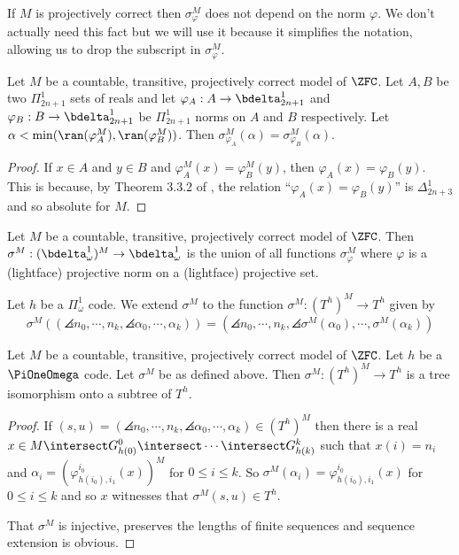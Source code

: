 \documentclass[oneside,12pt]{amsart}
\begin{document}
If $M$ is projectively correct then $\sigma^M_{\varphi}$ does not depend on the norm $\varphi$.
We don't actually need this fact but we will use it because it simplifies the
notation, allowing us to drop the subscript in $\sigma^M_{\varphi}$.

\begin{lemma}
Let $M$ be a countable, transitive, projectively correct model of $\ZFC$.
Let $A,B$ be two $\Pi^1_{2n+1}$ sets of reals and let $\varphi_A:A\to\bdelta^1_{2n+1}$
and $\varphi_B:B\to\bdelta^1_{2n+1}$ be $\Pi^1_{2n+1}$ norms on $A$ and $B$ respectively.
Let $\alpha < \min(\ran(\varphi^M_A),\ran(\varphi^M_B))$. Then
$\sigma^M_{\varphi_A}(\alpha) = \sigma^M_{\varphi_B}(\alpha)$.
\end{lemma}
\begin{proof}
If $x\in A$ and $y\in B$ and $\varphi^M_A(x) = \varphi^M_B(y)$, then
$\varphi_A(x)=\varphi_B(y)$. This is because,
by Theorem 3.3.2 of \cite{HarringtonKechris}, the relation
``$\varphi_A(x)=\varphi_B(y)$'' is $\Delta^1_{2n+3}$ and so absolute for $M$.
\end{proof}


\begin{definition}
\label{norm_embedding_def}
Let $M$ be a countable, transitive, projectively correct model of $\ZFC$.
Then $\sigma^M:(\bdelta^1_{\omega})^M\to\bdelta^1_{\omega}$ is the union of all
functions $\sigma^M_{\varphi}$ where $\varphi$ is a (lightface) projective norm on a
(lightface) projective set.

Let $h$ be a $\Pi^1_{\omega}$ code. We extend $\sigma^M$ to the function
$\sigma^M:(T^h)^M\to T^h$ given by
$$\sigma^M\left( (\angles{n_0,\cdots, n_k}, \angles{\alpha_0, \cdots, \alpha_k}  ) \right) =
(\angles{n_0,\cdots, n_k}, \angles{\sigma^M(\alpha_0), \cdots, \sigma^M(\alpha_k)}  )$$
\end{definition}

\begin{lemma}
\label{tree_embedding_lemma}
Let $M$ be a countable, transitive, projectively correct model of $\ZFC$.
Let $h$ be a $\PiOneOmega$ code.
Let $\sigma^M$ be as defined above. Then $\sigma^M:(T^h)^M\to T^h$ is a tree isomorphism
onto a subtree of $T^h$.
\end{lemma}
\begin{proof}
If $(s,u) = (\angles{n_0,\cdots, n_k}, \angles{\alpha_0, \cdots, \alpha_k}  ) \in (T^h)^M$
then there is a real $x\in M \intersect G^0_{h(0)} \intersect \cdots \intersect G^k_{h(k)}$ such
that $x(i)=n_i$ and $\alpha_i=(\varphi^{i_0}_{h(i_0),i_1}(x))^M$  for $0\leq i \leq k$.
So $\sigma^M(\alpha_i) = \varphi^{i_0}_{h(i_0),i_1}(x)$ for $0\leq i \leq k$ and so
$x$ witnesses that  $\sigma^M(s,u)\in T^h$.

That $\sigma^M$ is injective, preserves the lengths of finite sequences and sequence extension
is obvious.
\end{proof}
\end{document}
